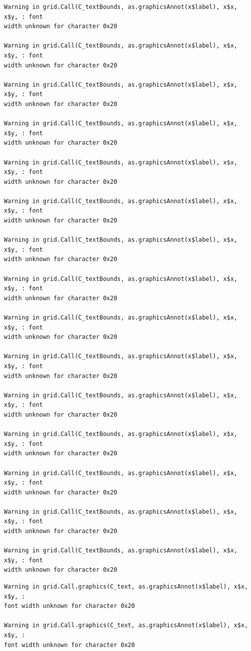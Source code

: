 \documentclass[
  letterpaper,
  DIV=11,
  numbers=noendperiod,
  oneside]{scrartcl}
\begin{document}
\begin{verbatim}
Warning in grid.Call(C_textBounds, as.graphicsAnnot(x$label), x$x, x$y, : font
width unknown for character 0x20

Warning in grid.Call(C_textBounds, as.graphicsAnnot(x$label), x$x, x$y, : font
width unknown for character 0x20

Warning in grid.Call(C_textBounds, as.graphicsAnnot(x$label), x$x, x$y, : font
width unknown for character 0x20

Warning in grid.Call(C_textBounds, as.graphicsAnnot(x$label), x$x, x$y, : font
width unknown for character 0x20

Warning in grid.Call(C_textBounds, as.graphicsAnnot(x$label), x$x, x$y, : font
width unknown for character 0x20

Warning in grid.Call(C_textBounds, as.graphicsAnnot(x$label), x$x, x$y, : font
width unknown for character 0x20

Warning in grid.Call(C_textBounds, as.graphicsAnnot(x$label), x$x, x$y, : font
width unknown for character 0x20

Warning in grid.Call(C_textBounds, as.graphicsAnnot(x$label), x$x, x$y, : font
width unknown for character 0x20

Warning in grid.Call(C_textBounds, as.graphicsAnnot(x$label), x$x, x$y, : font
width unknown for character 0x20

Warning in grid.Call(C_textBounds, as.graphicsAnnot(x$label), x$x, x$y, : font
width unknown for character 0x20

Warning in grid.Call(C_textBounds, as.graphicsAnnot(x$label), x$x, x$y, : font
width unknown for character 0x20

Warning in grid.Call(C_textBounds, as.graphicsAnnot(x$label), x$x, x$y, : font
width unknown for character 0x20

Warning in grid.Call(C_textBounds, as.graphicsAnnot(x$label), x$x, x$y, : font
width unknown for character 0x20

Warning in grid.Call(C_textBounds, as.graphicsAnnot(x$label), x$x, x$y, : font
width unknown for character 0x20

Warning in grid.Call(C_textBounds, as.graphicsAnnot(x$label), x$x, x$y, : font
width unknown for character 0x20
\end{verbatim}

\begin{verbatim}
Warning in grid.Call.graphics(C_text, as.graphicsAnnot(x$label), x$x, x$y, :
font width unknown for character 0x20

Warning in grid.Call.graphics(C_text, as.graphicsAnnot(x$label), x$x, x$y, :
font width unknown for character 0x20
\end{verbatim}
\end{document}
